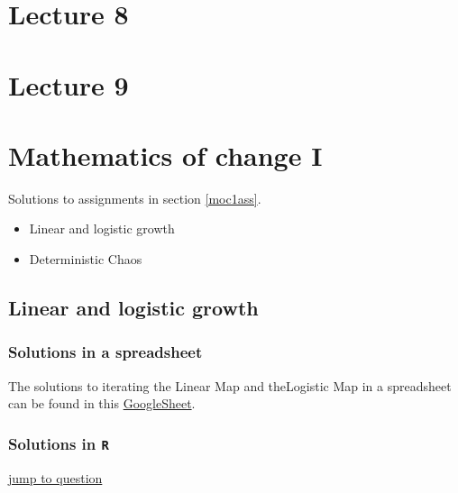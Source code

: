 \documentclass[]{book}
\providecommand{\tightlist}{%
  \setlength{\itemsep}{0pt}\setlength{\parskip}{0pt}}
\let\stdsection\section
\renewcommand\section{\newpage\stdsection}
\begin{document}
\chapter*{Lecture 8}\label{lecture-8}

\chapter*{Lecture 9}\label{lecture-9}

\appendix


\chapter{\texorpdfstring{\textbf{Mathematics of change
I}}{Mathematics of change I}}\label{mathematics-of-change-i}

Solutions to assignments in section \ref{moc1ass}.

\begin{itemize}
\tightlist
\item
  Linear and logistic growth
\item
  Deterministic Chaos
\end{itemize}

\hypertarget{linear-and-logistic-growth}{\section{Linear and logistic
growth}\label{linear-and-logistic-growth}}

\subsection*{Solutions in a
spreadsheet}\label{solutions-in-a-spreadsheet}

The solutions to iterating the Linear Map and theLogistic Map in a
spreadsheet can be found in this
\href{https://docs.google.com/spreadsheets/d/1BL_oKoCFH3NQ3qKLBQ-WbkPg_ppSZsyDNl2nS9oPGcM/edit?usp=sharing}{GoogleSheet}.

\subsection*{\texorpdfstring{Solutions in
\texttt{R}}{Solutions in R}}\label{solutions-in-r}

\href{\%7B\#moc1R\%7D}{\textbar{} jump to question \textbar{}}
\end{document}
